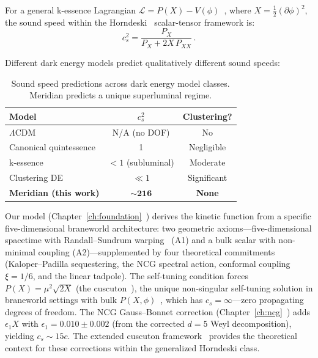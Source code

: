 For a general k-essence Lagrangian $\mathcal{L} = P(X) - V(\phi)$~\cite{ch5:ArmendarizPicon2000}, where $X = \tfrac{1}{2}(\partial\phi)^2$, the sound speed within the Horndeski~\cite{ch5:Horndeski1974} scalar-tensor framework is:
\begin{equation}
  c_s^2 = \frac{P_X}{P_X + 2X\,P_{XX}}\,.
  \label{eq:5-1}
\end{equation}

Different dark energy models predict qualitatively different sound speeds:

\begin{table}[ht]
\centering
\caption{Sound speed predictions across dark energy model classes. Meridian predicts a unique superluminal regime.}
\label{tab:5-1}
\begin{tabular}{lcc}
\toprule
Model & $c_s^2$ & Clustering? \\
\midrule
$\Lambda$CDM & N/A (no DOF) & No \\
Canonical quintessence & 1 & Negligible \\
k-essence & $< 1$ (subluminal) & Moderate \\
Clustering DE & $\ll 1$ & Significant \\
\textbf{Meridian (this work)} & $\mathbf{\sim 216}$ & \textbf{None} \\
\bottomrule
\end{tabular}
\end{table}

Our model (Chapter~\ref{ch:foundation}~\cite{ch5:PaperI}) derives the kinetic function from a specific five-dimensional braneworld architecture: two geometric axioms---five-dimensional spacetime with Randall--Sundrum warping~\cite{ch5:RandallSundrum1999} (A1) and a bulk scalar with non-minimal coupling (A2)---supplemented by four theoretical commitments (Kaloper--Padilla sequestering, the NCG spectral action, conformal coupling $\xi = 1/6$, and the linear tadpole). The self-tuning condition forces $P(X) = \mu^2\sqrt{2X}$ (the cuscuton~\cite{ch5:Afshordi2007}), the unique non-singular self-tuning solution in braneworld settings with bulk $P(X,\phi)$~\cite{ch5:LacombeMukohyama2022}, which has $c_s = \infty$---zero propagating degrees of freedom. The NCG Gauss--Bonnet correction (Chapter~\ref{ch:ncg}~\cite{ch5:PaperIV}) adds $\epsilon_1 X$ with $\epsilon_1 = 0.010 \pm 0.002$ (from the corrected $d = 5$ Weyl decomposition), yielding $c_s \sim 15c$. The extended cuscuton framework~\cite{ch5:Kobayashi2011,ch5:Deffayet2010} provides the theoretical context for these corrections within the generalized Horndeski class.

